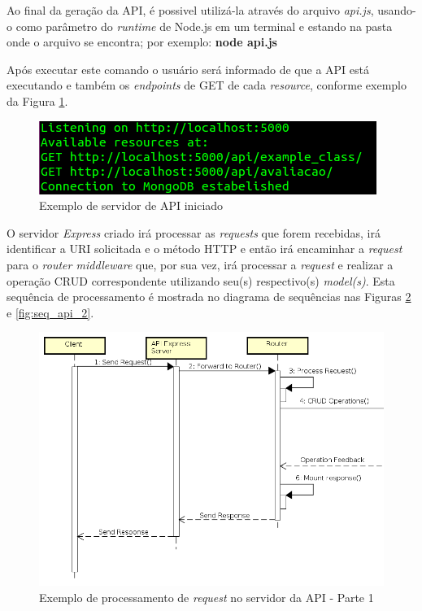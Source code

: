 Ao final da geração da API, é possivel utilizá-la através do arquivo \textit{api.js}, usando-o como parâmetro do \textit{runtime} de Node.js em um terminal e estando na pasta onde o arquivo se encontra; por exemplo: \textbf{node api.js}

Após executar este comando o usuário será informado de que a API está executando e também os \textit{endpoints} de GET de cada \textit{resource}, conforme exemplo da Figura \ref{fig:api_console}.

\begin{figure}
    \begin{center}
        \includegraphics[scale=0.7]{imagens/outApiConsole.png}
    \end{center}
	\caption{\label{fig:api_console}Exemplo de servidor de API iniciado}
\end{figure}

O servidor \textit{Express} criado irá processar as \textit{requests} que forem recebidas, irá identificar a URI solicitada e o método HTTP e então irá encaminhar a \textit{request} para o \textit{router middleware} que, por sua vez, irá processar a \textit{request} e realizar a operação CRUD correspondente utilizando seu(s) respectivo(s) \textit{model(s)}. Esta sequência de processamento é mostrada no diagrama de sequências nas Figuras \ref{fig:seq_api_1} e \ref{fig:seq_api_2}.


\begin{figure}
    \begin{center}
        \includegraphics[scale=0.7]{imagens/API_Sequence_Diagram_1.png}
    \end{center}
	\caption{\label{fig:seq_api_1}Exemplo de processamento de \textit{request} no servidor da API - Parte 1}
\end{figure}

